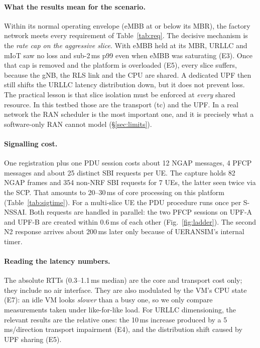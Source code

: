 \paragraph{What the results mean for the scenario.} Within its normal operating envelope
(eMBB at or below its MBR), the factory network meets every requirement of
Table~\ref{tab:req}. The decisive mechanism is the \emph{rate cap on the aggressive slice}.
With eMBB held at its MBR, URLLC and mIoT saw no loss and sub-2\,ms p99 even when eMBB was
saturating (E3). Once that cap is removed and the platform is overloaded (E5), every slice
suffers, because the gNB, the RLS link and the CPU are shared. A dedicated UPF then still
shifts the URLLC latency distribution down, but it does not prevent loss. The practical
lesson is that slice isolation must be enforced at \emph{every} shared resource. In this
testbed those are the transport (tc) and the UPF. In a real network the RAN scheduler is the
most important one, and it is precisely what a software-only RAN cannot model
(\S\ref{sec:limits}).

\paragraph{Signalling cost.} One registration plus one PDU session costs about 12 NGAP
messages, 4 PFCP messages and about 25 distinct SBI requests per UE. The capture holds 82
NGAP frames and 354 non-NRF SBI requests for 7 UEs, the latter seen twice via the SCP. That
amounts to 20--30\,ms of core processing on this platform (Table~\ref{tab:sigtime}). For a
multi-slice UE the PDU procedure runs once per S-NSSAI. Both requests are handled in
parallel: the two PFCP sessions on UPF-A and UPF-B are created within 0.6\,ms of each other
(Fig.~\ref{fig:ladder}). The second N2 response arrives about 200\,ms later only because of
UERANSIM's internal timer.

\paragraph{Reading the latency numbers.} The absolute RTTs (0.3--1.1\,ms median) are the
core and transport cost only; they include no air interface. They are also modulated by the
VM's CPU state (E7): an idle VM looks \emph{slower} than a busy one, so we only compare
measurements taken under like-for-like load. For URLLC dimensioning, the relevant results
are the relative ones: the 10\,ms increase produced by a 5\,ms/direction transport impairment
(E4), and the distribution shift caused by UPF sharing (E5).
